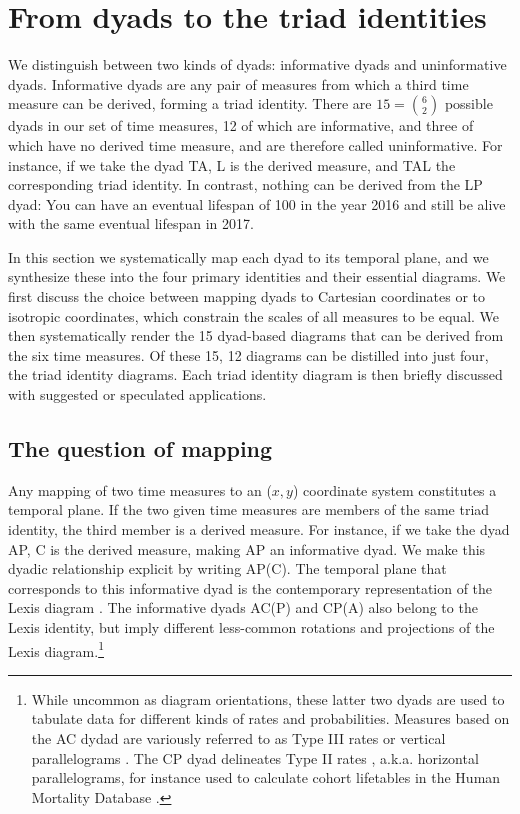 \documentclass[12pt,oneside,a4paper]{article} %
\begin{document}

\section{From dyads to the triad identities}
We distinguish between two kinds of dyads: informative dyads and uninformative dyads. Informative dyads are any pair of measures from which a third time measure
can be derived, forming a triad identity. There are
$15=\binom{6}{2}$ possible dyads in our set of time measures, 12 of which are
informative, and three of which have no derived time measure, and are therefore
called uninformative. For instance, if we take the dyad TA, L is the derived
measure, and TAL the corresponding triad identity. In contrast, nothing can be derived from the LP dyad: You can have an eventual lifespan of 100 in the year 2016 and still be alive with the same eventual lifespan in 2017.

In this section we systematically map each dyad to its temporal plane, and we
synthesize these into the four primary identities and their essential diagrams.
We first discuss the choice between mapping dyads to Cartesian coordinates or to
isotropic coordinates, which constrain the scales of all measures to be equal.
We then systematically render the 15 dyad-based diagrams that can be derived from the six time measures. Of these 15, 12 diagrams can be distilled into just four, the triad identity diagrams. Each
triad identity diagram is then briefly discussed with suggested or speculated
applications.

\subsection{The question of mapping}
Any mapping of two time measures to an ($x,y$) coordinate
system constitutes a temporal plane. If the two given time measures are members of the same triad identity, the third member is a derived
measure. For instance, if we take the dyad AP, C is the derived
measure, making AP an informative dyad. We make this dyadic relationship
explicit by writing AP(C).
The temporal plane that corresponds to this informative dyad is the contemporary representation of the
Lexis diagram \citep{lexis1875einleitung, pressat1961analyse}. The informative
dyads AC(P) and CP(A) also belong to the Lexis identity, but imply different
less-common rotations and projections of the Lexis diagram.\footnote{While
uncommon as diagram orientations, these latter two dyads are used to tabulate
data for different kinds of rates and probabilities. Measures
based on the AC dydad are variously referred to as Type III rates
\citep{caselli2005demography} or vertical parallelograms \citep{HMDMP}. The CP
dyad delineates Type II rates \citep{caselli2005demography}, a.k.a. horizontal
parallelograms, for instance used to calculate cohort lifetables in the Human
Mortality Database \citep{HMDMP}. }
\end{document}
